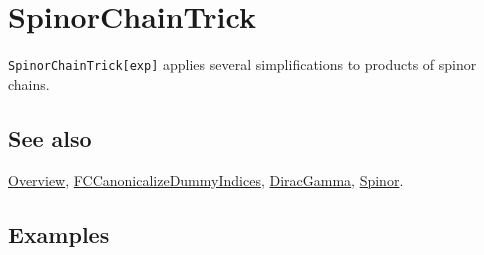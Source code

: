 \documentclass[../FeynCalcManual.tex]{subfiles}
\begin{document}
\hypertarget{spinorchaintrick}{%
\section{SpinorChainTrick}\label{spinorchaintrick}}

\texttt{SpinorChainTrick[\allowbreak{}exp]} applies several
simplifications to products of spinor chains.

\subsection{See also}

\hyperlink{toc}{Overview},
\hyperlink{fccanonicalizedummyindices}{FCCanonicalizeDummyIndices},
\hyperlink{diracgamma}{DiracGamma}, \hyperlink{spinor}{Spinor}.

\subsection{Examples}

\begin{Shaded}
\begin{Highlighting}[]
\OperatorTok{[}\OperatorTok{,}\OperatorTok{]}\OperatorTok{[}\SpecialCharTok{\textbackslash{}}\OperatorTok{[}\OperatorTok{]]}\OperatorTok{[}\OperatorTok{,}\OperatorTok{]}\OperatorTok{[}\OperatorTok{,}\OperatorTok{]}\OperatorTok{[}\SpecialCharTok{\textbackslash{}}\OperatorTok{[}\OperatorTok{]]}\OperatorTok{[}\OperatorTok{,}\OperatorTok{]} \SpecialCharTok{+}
   \OperatorTok{[}\OperatorTok{,}\OperatorTok{]}\OperatorTok{[}\SpecialCharTok{\textbackslash{}}\OperatorTok{[}\OperatorTok{]]}\OperatorTok{[}\OperatorTok{,}\OperatorTok{]}\OperatorTok{[}\OperatorTok{,}\OperatorTok{]}\OperatorTok{[}\SpecialCharTok{\textbackslash{}}\OperatorTok{[}\OperatorTok{]]}\OperatorTok{[}\OperatorTok{,}\OperatorTok{]} 
 
\OperatorTok{[}\SpecialCharTok{\%}\OperatorTok{]}
\end{Highlighting}
\end{Shaded}
\end{document}
